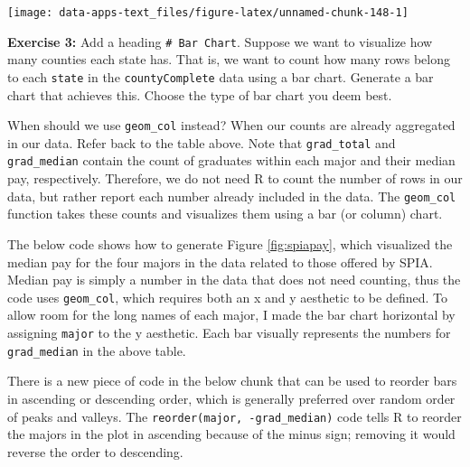 \documentclass[
]{book}
\newenvironment{rmdblock}[1]
  {\begin{shaded*}
  }
  {\end{shaded*}
  }
\newenvironment{learncheck}
  {\begin{rmdblock}{warning}}
  {\end{rmdblock}}
\begin{document}
\begin{center}\texttt{[image: data-apps-text\_files/figure-latex/unnamed-chunk-148-1]} \end{center}

\begin{learncheck}
\textbf{Exercise 3:} Add a heading \texttt{\#\ Bar\ Chart}. Suppose we
want to visualize how many counties each state has. That is, we want to
count how many rows belong to each \texttt{state} in the
\texttt{countyComplete} data using a bar chart. Generate a bar chart
that achieves this. Choose the type of bar chart you deem best.
\end{learncheck}

When should we use \texttt{geom\_col} instead? When our counts are already aggregated in our data. Refer back to the table above. Note that \texttt{grad\_total} and \texttt{grad\_median} contain the count of graduates within each major and their median pay, respectively. Therefore, we do not need R to count the number of rows in our data, but rather report each number already included in the data. The \texttt{geom\_col} function takes these counts and visualizes them using a bar (or column) chart.

The below code shows how to generate Figure \ref{fig:spiapay}, which visualized the median pay for the four majors in the data related to those offered by SPIA. Median pay is simply a number in the data that does not need counting, thus the code uses \texttt{geom\_col}, which requires both an x and y aesthetic to be defined. To allow room for the long names of each major, I made the bar chart horizontal by assigning \texttt{major} to the y aesthetic. Each bar visually represents the numbers for \texttt{grad\_median} in the above table.

There is a new piece of code in the below chunk that can be used to reorder bars in ascending or descending order, which is generally preferred over random order of peaks and valleys. The \texttt{reorder(major,\ -grad\_median)} code tells R to reorder the majors in the plot in ascending because of the minus sign; removing it would reverse the order to descending.
\end{document}
